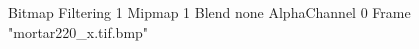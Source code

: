 {Bitmap
	{Filtering 1}
	{Mipmap 1}
	{Blend none}
	{AlphaChannel 0}
	{Frame "mortar220_x.tif.bmp"}
}
